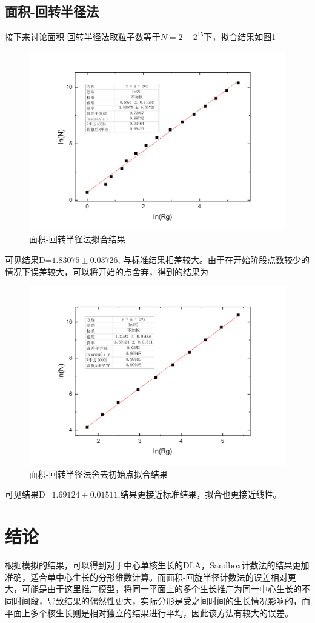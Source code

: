 \documentclass{article}
\begin{document}
\subsection{面积-回转半径法}
接下来讨论面积-回转半径法取粒子数等于$ N=2-2^{15} $下，拟合结果如图\ref*{fig:3}
		\begin{figure}[!h]
	
	\centering
	\includegraphics[scale=0.5]{Rg}
	\caption{\heiti{}面积-回转半径法拟合结果}
	\label{fig:3}
\end{figure}
可见结果D=$ 1.83075\pm 0.03726 $, 与标准结果相差较大。由于在开始阶段点数较少的情况下误差较大，可以将开始的点舍弃，得到的结果为
		\begin{figure}[!h]
	
	\centering
	\includegraphics[scale=0.5]{Rg_1}
	\caption{\heiti{}面积-回转半径法舍去初始点拟合结果}
	\label{fig:4}
\end{figure}
可见结果D=$ 1.69124\pm 0.01511 $,结果更接近标准结果，拟合也更接近线性。
	\section{结论}
	根据模拟的结果，可以得到对于中心单核生长的DLA，Sandbox计数法的结果更加准确，适合单中心生长的分形维数计算。而面积-回旋半径计数法的误差相对更大，可能是由于这里推广模型，将同一平面上的多个生长推广为同一中心生长的不同时间段，导致结果的偶然性更大，实际分形是受之间时间的生长情况影响的，而平面上多个核生长则是相对独立的结果进行平均，因此该方法有较大的误差。
\end{document}
